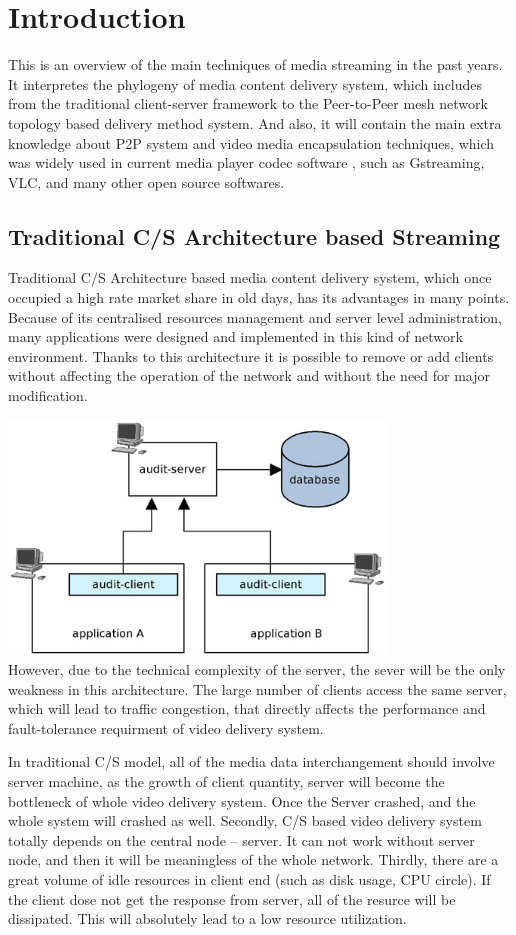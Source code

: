\chapter{Introduction}
\label{Introduction}
{This is an overview of the main techniques of media streaming in the past years. It interpretes the phylogeny of media content delivery system, which includes from the traditional client-server framework to the Peer-to-Peer mesh network topology based delivery method system. And also, it will contain the main extra knowledge about P2P system and video media encapsulation techniques, which was widely used in current media player codec software , such as Gstreaming, VLC, and many other open source softwares.}

\section{Traditional C/S Architecture based Streaming}
{
  Traditional C/S Architecture based media content delivery system, which once occupied a high rate market share in old days, has its advantages in many points. Because of its centralised resources management and server level administration, many applications were designed and implemented in this kind of network environment. Thanks to this architecture it is possible to remove or add clients without affecting the operation of the network and without the need for major modification.

\includegraphics[width=10cm]{data/architecture-small.jpg}
\\

However, due to the technical complexity of the server, the sever will be the only weakness in this architecture. The large number of clients access the same server, which will lead to traffic congestion, that directly affects the performance and fault-tolerance requirment of video delivery system.

In traditional C/S model, all of the media data interchangement should involve server machine, as the growth of client quantity, server will become the bottleneck of whole video delivery system. Once the Server crashed, and the whole system will crashed as well. Secondly, C/S based video delivery system totally depends on the central node -- server. It can not work without server node, and then it will be meaningless of the whole network. Thirdly, there are a great volume of idle resources in client end (such as disk usage, CPU circle). If the client dose not get the response from server, all of the resurce will be dissipated. This will absolutely lead to a low resource utilization.
}

